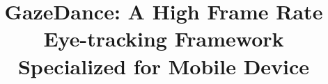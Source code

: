 \documentclass[acmlarge]{acmart}
\begin{document}
\title{GazeDance: A High Frame Rate Eye-tracking Framework Specialized for Mobile Device}









\end{document}
